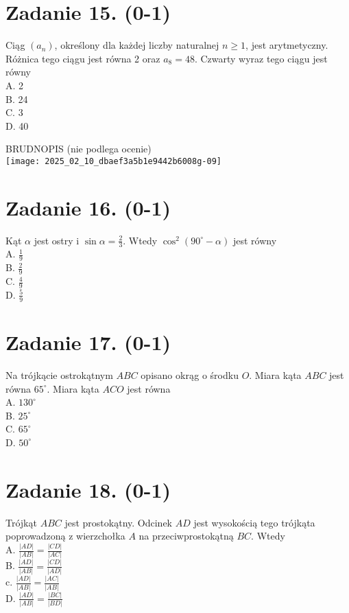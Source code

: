 \documentclass[10pt]{article}
\begin{document}
\section*{Zadanie 15. (0-1)}
Ciąg \(\left(a_{n}\right)\), określony dla każdej liczby naturalnej \(n \geq 1\), jest arytmetyczny. Różnica tego ciągu jest równa 2 oraz \(a_{8}=48\). Czwarty wyraz tego ciągu jest równy\\
A. 2\\
B. 24\\
C. 3\\
D. 40

BRUDNOPIS (nie podlega ocenie)\\
\texttt{[image: 2025\_02\_10\_dbaef3a5b1e9442b6008g-09]}

\section*{Zadanie 16. (0-1)}
Kąt \(\alpha\) jest ostry i \(\sin \alpha=\frac{2}{3}\). Wtedy \(\cos ^{2}\left(90^{\circ}-\alpha\right)\) jest równy\\
A. \(\frac{1}{9}\)\\
B. \(\frac{2}{9}\)\\
C. \(\frac{4}{9}\)\\
D. \(\frac{5}{9}\)

\section*{Zadanie 17. (0-1)}
Na trójkącie ostrokątnym \(A B C\) opisano okrąg o środku \(O\). Miara kąta \(A B C\) jest równa \(65^{\circ}\). Miara kąta \(A C O\) jest równa\\
A. \(130^{\circ}\)\\
B. \(25^{\circ}\)\\
C. \(65^{\circ}\)\\
D. \(50^{\circ}\)

\section*{Zadanie 18. (0-1)}
Trójkąt \(A B C\) jest prostokątny. Odcinek \(A D\) jest wysokością tego trójkąta poprowadzoną z wierzchołka \(A\) na przeciwprostokątną \(B C\). Wtedy\\
A. \(\frac{|A D|}{|A B|}=\frac{|C D|}{|A C|}\)\\
B. \(\frac{|A D|}{|A B|}=\frac{|C D|}{|A D|}\)\\
c. \(\frac{|A D|}{|A B|}=\frac{|A C|}{|A B|}\)\\
D. \(\frac{|A D|}{|A B|}=\frac{|B C|}{|B D|}\)
\end{document}
